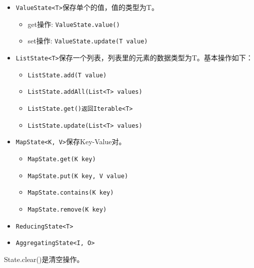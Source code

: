 \documentclass[cn,11pt,chinese]{elegantbook}
\providecommand{\tightlist}{%
  \setlength{\itemsep}{0pt}\setlength{\parskip}{0pt}}
\begin{document}
\begin{itemize}
\tightlist
\item
  \texttt{ValueState\textless{}T\textgreater{}}保存单个的值，值的类型为T。

  \begin{itemize}
  \tightlist
  \item
    get操作: \texttt{ValueState.value()}
  \item
    set操作: \texttt{ValueState.update(T\ value)}
  \end{itemize}
\item
  \texttt{ListState\textless{}T\textgreater{}}保存一个列表，列表里的元素的数据类型为T。基本操作如下：

  \begin{itemize}
  \tightlist
  \item
    \texttt{ListState.add(T\ value)}
  \item
    \texttt{ListState.addAll(List\textless{}T\textgreater{}\ values)}
  \item
    \texttt{ListState.get()返回Iterable\textless{}T\textgreater{}}
  \item
    \texttt{ListState.update(List\textless{}T\textgreater{}\ values)}
  \end{itemize}
\item
  \texttt{MapState\textless{}K,\ V\textgreater{}}保存Key-Value对。

  \begin{itemize}
  \tightlist
  \item
    \texttt{MapState.get(K\ key)}
  \item
    \texttt{MapState.put(K\ key,\ V\ value)}
  \item
    \texttt{MapState.contains(K\ key)}
  \item
    \texttt{MapState.remove(K\ key)}
  \end{itemize}
\item
  \texttt{ReducingState\textless{}T\textgreater{}}
\item
  \texttt{AggregatingState\textless{}I,\ O\textgreater{}}
\end{itemize}

State.clear()是清空操作。
\end{document}
